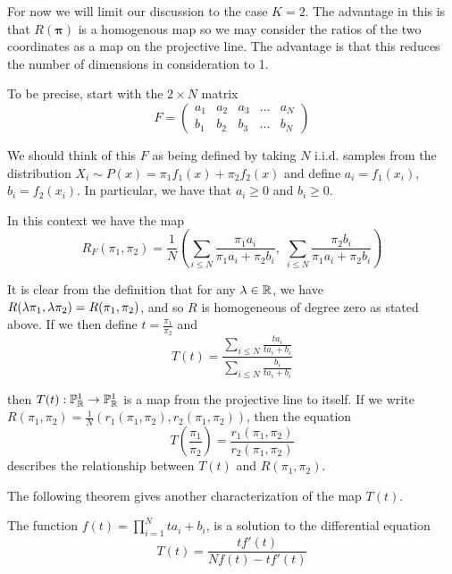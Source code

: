 For now we will limit our discussion to the case $K=2$.  The advantage in this is that $R(\bm\pi)$ is a homogenous map so we may consider the ratios of the two coordinates as a map on the projective line.  The advantage is that this reduces the number of dimensions in consideration to 1.

To be precise, start with the $2\times N$ matrix
\begin{equation}\label{eqn:FdefK2}
	F=
	\begin{pmatrix}
	a_1 & a_2 & a_3 & \ldots & a_N\\
	b_1 & b_2 & b_3 & \ldots & b_N
	\end{pmatrix}
\end{equation}

We should think of this $F$ as being defined by taking $N$ i.i.d. samples from the distribution $X_i\sim P(x)=\pi_1 f_1(x)+\pi_2 f_2(x)$ and define $a_i=f_1(x_i)$, $b_i=f_2(x_i)$. In particular, we have that $a_i\geq 0$ and $b_i\geq 0$.

In this context we have the map 
\begin{equation}\label{eqn:RdefK2}
R_F(\pi_1,\pi_2)=\frac 1N\left (\sum_{i\leq N}\frac{\pi_1a_i}{\pi_1a_i+\pi_2b_i},\; \sum_{i\leq N}\frac{\pi_2b_i}{\pi_1a_i+\pi_2b_i}\right )
\end{equation}

It is clear from the definition that for any $\lambda\in\mathbb R$, we have $R(\lambda\pi_1,\lambda\pi_2)=R(\pi_1,\pi_2)$, and so $R$ is homogeneous of degree zero as stated above. If we then define $t=\frac{\pi_1}{\pi_2}$ and 
\begin{equation}\label{eqn:Tdefn}
T(t)=\frac{\sum_{i\leq N}\frac{ta_i}{ta_i+b_i}}{\sum_{i\leq N}\frac{b_i}{ta_i+b_i}}
\end{equation}

then $T(t):\mathbb{P}^1_{\mathbb R}\rightarrow\mathbb{P}^1_{\mathbb R}$ is a map from the projective line to itself.  If we write \( R(\pi_1,\pi_2) = \frac 1N (r_1(\pi_1,\pi_2),r_2(\pi_1,\pi_2)) \), then the equation 
\begin{equation}\label{eqn:coordRatios}
T\left(\frac{\pi_1}{\pi_2}\right)= \frac{r_1(\pi_1,\pi_2)}{r_2(\pi_1,\pi_2)}
\end{equation}
describes the relationship between \( T(t) \) and \( R(\pi_1,\pi_2) \).

The following theorem gives another characterization of the map $T(t)$.

\begin{thm}\label{ODE}
The function $f(t)=\prod_{i=1}^{N} ta_i+b_i$, is a solution to the differential equation \[T(t)=\frac{tf'(t)}{Nf(t)-tf'(t)}\]
\end{thm}

